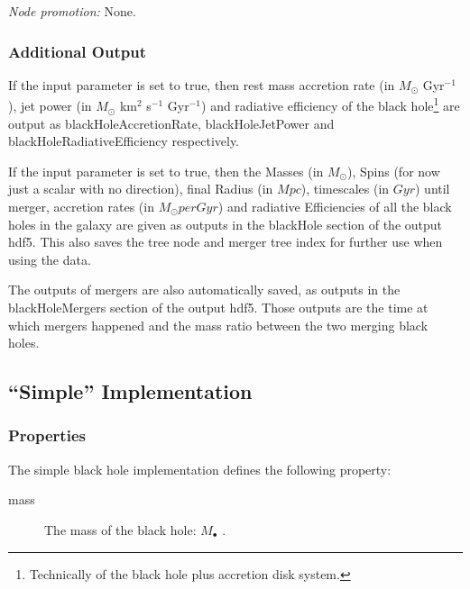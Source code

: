 \noindent\emph{Node promotion:} None.\\

\subsubsection{Additional Output}

If the {\normalfont \ttfamily [blackHoleOutputAccretion]} input parameter is set to true, then rest mass accretion rate (in $M_\odot$ Gyr$^{-1}$), jet power (in $M_\odot$ km$^2$ s$^{-1}$ Gyr$^{-1}$) and radiative efficiency of the black hole\footnote{Technically of the black hole plus accretion disk system.} are output as {\normalfont \ttfamily blackHoleAccretionRate}, {\normalfont \ttfamily blackHoleJetPower} and {\normalfont \ttfamily blackHoleRadiativeEfficiency} respectively.

If the {\normalfont \ttfamily [blackHoleOutputData]} input parameter is set to true, then the Masses (in $M_\odot$), Spins (for now just a scalar with no direction), final Radius (in $Mpc$), timescales (in $Gyr$) until merger, accretion rates (in $M_\odot per Gyr$) and radiative Efficiencies of all the black holes in the galaxy are given as outputs in the {\normalfont \ttfamily blackHole} section of the output hdf5. This also saves the tree \gls{node} and merger tree index for further use when using the data.

The outputs of mergers are also automatically saved, as outputs in the {\normalfont \ttfamily blackHoleMergers} section of the output hdf5. Those outputs are the time at which mergers happened and the mass ratio between  the two merging black holes.


\subsection{``Simple'' Implementation}

\subsubsection{Properties}

The simple black hole implementation defines the following property:
\begin{description}
 \item [{\normalfont \ttfamily mass}] The mass of the black hole: $M_\bullet$ {\normalfont \ttfamily [blackHoleMass]}.
\end{description}

